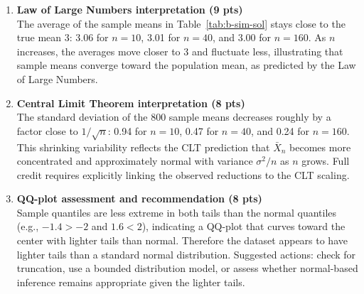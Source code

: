 \documentclass[11pt]{article}
\begin{document}
\begin{enumerate}
  \item \textbf{Law of Large Numbers interpretation (9 pts)}\\
  The average of the sample means in Table~\ref{tab:b-sim-sol} stays close to the true mean 3: 3.06 for $n=10$, 3.01 for $n=40$, and 3.00 for $n=160$. As $n$ increases, the averages move closer to 3 and fluctuate less, illustrating that sample means converge toward the population mean, as predicted by the Law of Large Numbers.

  \item \textbf{Central Limit Theorem interpretation (8 pts)}\\
  The standard deviation of the 800 sample means decreases roughly by a factor close to $1/\sqrt{n}$: 0.94 for $n=10$, 0.47 for $n=40$, and 0.24 for $n=160$. This shrinking variability reflects the CLT prediction that $\bar X_n$ becomes more concentrated and approximately normal with variance $\sigma^2/n$ as $n$ grows. Full credit requires explicitly linking the observed reductions to the CLT scaling.

  \item \textbf{QQ-plot assessment and recommendation (8 pts)}\\
  Sample quantiles are less extreme in both tails than the normal quantiles (e.g., $-1.4>-2$ and $1.6<2$), indicating a QQ-plot that curves toward the center with lighter tails than normal. Therefore the dataset appears to have lighter tails than a standard normal distribution. Suggested actions: check for truncation, use a bounded distribution model, or assess whether normal-based inference remains appropriate given the lighter tails.
\end{enumerate}
\end{document}
